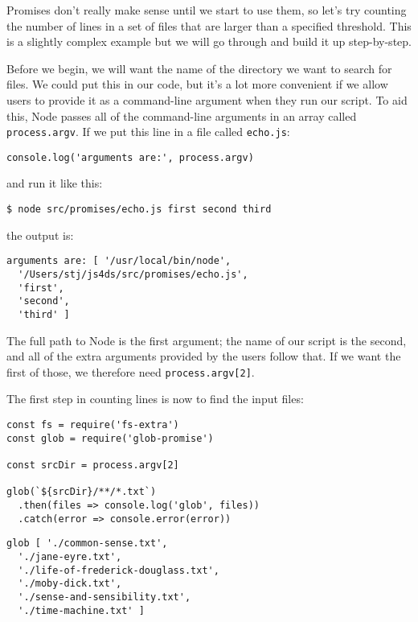 Promises don't really make sense until we start to use them,
so let's try counting the number of lines in a set of files
that are larger than a specified threshold.
This is a slightly complex example but we will go through and build it up step-by-step.

Before we begin,
we will want the name of the directory we want to search for files.
We could put this in our code,
but it's a lot more convenient if we allow users to provide it as a command-line argument
when they run our script.
To aid this,
Node passes all of the command-line arguments in an array called \texttt{process.argv}.
If we put this line in a file called \texttt{echo.js}:

\begin{verbatim}
console.log('arguments are:', process.argv)
\end{verbatim}

\noindent
and run it like this:

\begin{verbatim}
$ node src/promises/echo.js first second third
\end{verbatim}

\noindent
the output is:

\begin{verbatim}
arguments are: [ '/usr/local/bin/node',
  '/Users/stj/js4ds/src/promises/echo.js',
  'first',
  'second',
  'third' ]
\end{verbatim}

\noindent
The full path to Node is the first argument;
the name of our script is the second,
and all of the extra arguments provided by the users follow that.
If we want the first of those,
we therefore need \texttt{process.argv[2]}.

The first step in counting lines is now to find the input files:

\begin{verbatim}
const fs = require('fs-extra')
const glob = require('glob-promise')

const srcDir = process.argv[2]

glob(`${srcDir}/**/*.txt`)
  .then(files => console.log('glob', files))
  .catch(error => console.error(error))
\end{verbatim}

\begin{verbatim}
glob [ './common-sense.txt',
  './jane-eyre.txt',
  './life-of-frederick-douglass.txt',
  './moby-dick.txt',
  './sense-and-sensibility.txt',
  './time-machine.txt' ]
\end{verbatim}

